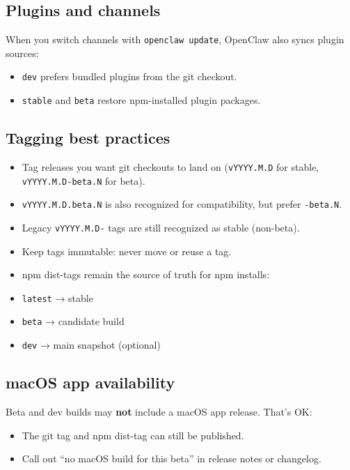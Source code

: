 \subsection{Plugins and channels}


When you switch channels with \texttt{openclaw update}, OpenClaw also syncs plugin sources:

\begin{itemize}
  \item \texttt{dev} prefers bundled plugins from the git checkout.
  \item \texttt{stable} and \texttt{beta} restore npm-installed plugin packages.
\end{itemize}


\subsection{Tagging best practices}


\begin{itemize}
  \item Tag releases you want git checkouts to land on (\texttt{vYYYY.M.D} for stable, \texttt{vYYYY.M.D-beta.N} for beta).
  \item \texttt{vYYYY.M.D.beta.N} is also recognized for compatibility, but prefer \texttt{-beta.N}.
  \item Legacy \texttt{vYYYY.M.D-} tags are still recognized as stable (non-beta).
  \item Keep tags immutable: never move or reuse a tag.
  \item npm dist-tags remain the source of truth for npm installs:
  \item \texttt{latest} → stable
  \item \texttt{beta} → candidate build
  \item \texttt{dev} → main snapshot (optional)
\end{itemize}


\subsection{macOS app availability}


Beta and dev builds may \textbf{not} include a macOS app release. That’s OK:

\begin{itemize}
  \item The git tag and npm dist-tag can still be published.
  \item Call out “no macOS build for this beta” in release notes or changelog.
\end{itemize}



